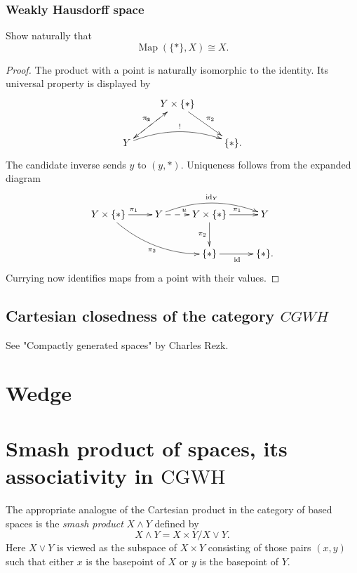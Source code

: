 \subsubsection{Weakly Hausdorff space}
\label{subsection-weakly-housdorff-space}

\begin{exercise}
Show naturally that
$$
\operatorname{Map}(\{*\},X)\cong X.
$$
\end{exercise}

\begin{proof}
The product with a point is naturally
isomorphic to the identity. Its universal
property is displayed by
$$
\xymatrix{
&Y\times\{*\}\ar[dr]^{\pi_2}
 \ar[dl]_{\pi_1}\\
Y\ar@/^1pc/[rr]^{!}
 \ar@{-->}[ur]^{u}
&&\{*\}.
}
$$
The candidate inverse sends $y$ to $(y,*)$.
Uniqueness follows from the expanded diagram
$$
\xymatrix{
Y\times\{*\}\ar[r]^{\pi_1}
 \ar@/_1pc/[drr]_{\pi_2}
&Y\ar@{-->}[r]^{u}
 \ar@/^1pc/[rr]^{\operatorname{id}_Y}
&Y\times\{*\}\ar[r]^{\pi_1}
 \ar[d]_{\pi_2}
&Y\\
&&\{*\}\ar[r]_{\operatorname{id}}
&\{*\}.
}
$$
Currying now identifies maps from a point
with their values.
\end{proof}

\subsection{Cartesian closedness of the
category $CGWH$}
\label{subsection-carte-close-categ-cgwh}
See "Compactly generated spaces" by Charles
Rezk.

\section{Wedge}
\label{section-wedge}

\section{Smash product of spaces, its
associativity in
\texorpdfstring{$\text{CGWH}$}{CGWH}}
\label{section-smash-produ-space-its-assoc}

The appropriate analogue of the Cartesian
product in the category of based spaces is
the {\it smash product} $X\wedge Y$ defined
by
$$X\wedge Y=X\times Y/X\vee Y.$$
Here $X\vee Y$ is viewed as the subspace of
$X\times Y$ consisting of those pairs $(x,y)$
such that either $x$ is the basepoint of $X$
or $y$ is the basepoint of $Y$.

